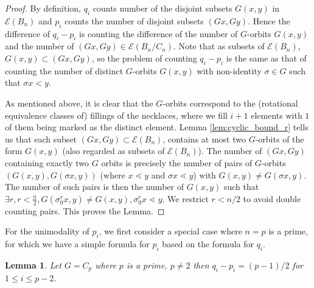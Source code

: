 \documentclass[10 pt]{amsart}
\theoremstyle{plain}
\newtheorem{lem}[thm]{Lemma}
\theoremstyle{definition}
\theoremstyle{remark}
\numberwithin{equation}{section}
\begin{document}
\begin{proof}
By definition, $q_i$ counts  number of the disjoint subsets $G(x, y)$ in $ \mathcal E (B_n)$ and $p_i$ counts the number of disjoint subsets $(Gx, Gy)$. Hence the difference of $q_i - p_i$ is counting the difference of the number of $G$-orbits $G (x ,y)$ and the number of $(Gx,Gy) \in  \mathcal E(B_n/C_n)$.  Note that as subsets of $ \mathcal E (B_n)$, $G(x, y) \subset (Gx, Gy)$, so the problem of counting $q_i - p_i$ is the same as that of counting the number of distinct $G$-orbits $G(x , y)$  with non-identity $\sigma \in G$ such that $\sigma x < y$. 


As mentioned above, it is clear that the $G$-orbits correspond to the (rotational equivalence classes of) fillings of the necklaces, where we fill $i+1$ elements with $1$ of them being marked as the distinct element. Lemma \ref{lem:cyclic_bound_r} tells us that each subset $(Gx, Gy) \subset  \mathcal E (B_n)$, contains at most two $G$-orbits of the form $G(x,y)$ (also regarded as subsets of $ \mathcal E (B_n)$). The number of $(Gx, Gy)$ containing exactly two $G$ orbits is precisely the number of pairs of $G$-orbits $(G (x, y),G(\sigma x, y ))$ (where $ x \lessdot y$ and $\sigma x \lessdot y$) with $G(x, y) \neq G(\sigma x, y).$ The number of such pairs is then the number of $G(x, y)$ such that $ \exists r,r<\frac n 2, G(\sigma_0^r x, y)\neq G(x, y),\sigma_0^r x \lessdot y.$ We restrict $r < n/2$ to avoid double counting pairs. This proves the Lemma.
\end{proof}

For the unimodality of $p_i$, we first consider a special case where $n = p$ is a prime, for which we have a simple formula for $p_i$ based on the formula for $q_i$.

\begin{lem}{\label{lem:cyclicprime}}
Let $G = C_p$ where $p$ is a prime, $p \neq 2$ then $q_i - p_i = (p-1)/2$ for $ 1 \le i \le p-2$. 
\end{lem}
\end{document}
